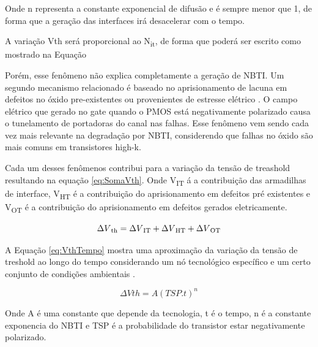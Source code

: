 Onde n representa a constante exponencial de difusão e é sempre menor que 1, de forma que a geração das interfaces irá desacelerar com o tempo.

A variação Vth será proporcional ao N\textsubscript{it}, de forma que poderá ser escrito como mostrado na Equação

Porém, esse fenômeno não explica completamente a geração de NBTI. Um segundo mecanismo relacionado é baseado no aprisionamento de lacuna em defeitos no óxido pre-existentes ou provenientes de estresse elétrico \cite{Butzen}. O campo elétrico que gerado no gate quando o PMOS está negativamente polarizado causa o tunelamento de portadoras do canal nas falhas. Esse fenômeno vem sendo cada vez mais relevante na degradação por NBTI, considerendo que falhas no óxido são mais comuns em transistores high-k.


Cada um desses fenômenos contribui para a variação da tensão de treashold resultando na equação \ref{eq:SomaVth}. Onde V\textsubscript{IT} á a contribuição das armadilhas de interface, V\textsubscript{HT} é a contribuição do aprisionamento em defeitos pré existentes e V\textsubscript{OT} é a contribuição do aprisionamento em defeitos gerados eletricamente.

\begin{equation}
    \label{eq:SomaVth}
    \Delta V{\textsubscript {th}} = \Delta V{\textsubscript {IT}} + \Delta V{\textsubscript {HT}} + \Delta V{\textsubscript {OT}}
\end{equation}

A Equação \ref{eq:VthTempo} mostra uma aproximação da variação da tensão de treshold ao longo do tempo considerando um nó tecnológico específico e um certo conjunto de condições ambientais \cite{Butzen}.

\begin{equation}
    \label{eq:VthTempo}
    \Delta Vth = A(TSP.t)^n
\end{equation}

Onde A é uma constante que depende da tecnologia, t é o tempo, n é a constante exponencia do NBTI e TSP é a probabilidade do transistor estar negativamente polarizado.
